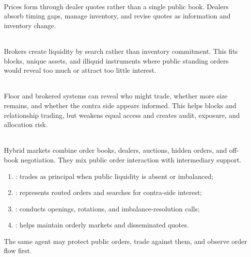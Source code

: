 \begin{mechanism} \\
Prices form through dealer quotes rather than a single public book. Dealers absorb timing gaps, manage inventory, and revise quotes as information and inventory change.
\end{mechanism}

\begin{mechanism} \\
Brokers create liquidity by search rather than inventory commitment. This fits blocks, unique assets, and illiquid instruments where public standing orders would reveal too much or attract too little interest.
\end{mechanism}

\begin{caveat} \\
Floor and brokered systems can reveal who might trade, whether more size remains, and whether the contra side appears informed. This helps blocks and relationship trading, but weakens equal access and creates audit, exposure, and allocation risk.
\end{caveat}

\begin{taxonomy} \\
Hybrid markets combine order books, dealers, auctions, hidden orders, and off-book negotiation. They mix public order interaction with intermediary support.
\end{taxonomy}

\begin{taxonomy} 
\begin{enumerate}[label=\roman*.]
\setlength{\itemsep}{0pt}
\item {}: trades as principal when public liquidity is absent or imbalanced;
\item {}: represents routed orders and searches for contra-side interest;
\item {}: conducts openings, rotations, and imbalance-resolution calls;
\item {}: helps maintain orderly markets and disseminated quotes.
\end{enumerate}
The same agent may protect public orders, trade against them, and observe order flow first.
\end{taxonomy}

